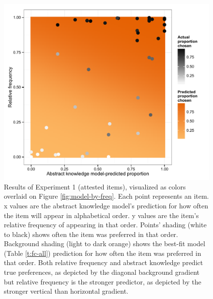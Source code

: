 \documentclass[authoryear]{elsarticle}
\begin{document}
\begin{figure}[t]
\includegraphics[scale=0.7]{fc-attested.pdf}

\caption{Results of Experiment 1 (attested items), visualized as colors overlaid on Figure \ref{fig:model-by-freq}. Each point represents an item. x values are the abstract knowledge model's prediction for how often the item will appear in alphabetical order. y values are the item's relative frequency of appearing in that order. Points' shading (white to black) shows often the item was preferred in that order. Background shading (light to dark orange) shows the best-fit model (Table \ref{t:fc-all}) prediction for how often the item was preferred in that order. Both relative frequency and abstract knowledge predict true preferences, as depicted by the diagonal background gradient but relative frequency is the stronger predictor, as depicted by the stronger vertical than horizontal gradient.} 
\label{fig:fc-freq}
\end{figure}

\end{document}
